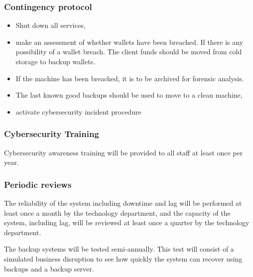 \subsubsection{Contingency protocol}
\begin{itemize}
\item Shut down all services,
  \item make an assessment of whether wallets have been breached.  If
    there is any possibility of a wallet breach.  The client funds should be
    moved from cold storage to backup wallets.
\item If the machine has been breached, it is to be archived for
  forensic analysis.
\item The last known good backups should be used to
  move to a clean machine,
\item activate cybersecurity incident procedure
\end{itemize}

\subsubsection{Cybersecurity Training}
Cybersecurity awareness training will be provided to all staff at
least once per year.

\subsubsection{Periodic reviews}

The reliability of the system including downtime and lag will be
performed at least once a month by the technology department, and the
capacity of the system, including lag, will be reviewed at least once a
quarter by the technology department.

The backup systems will be tested semi-annually.  This test will
consist of a simulated business disruption to see how quickly the
system can recover using backups and a backup server.

